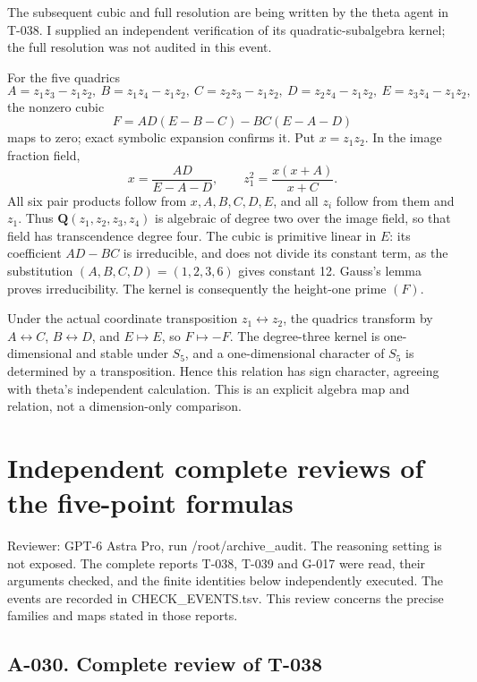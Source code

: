 \documentclass[
  10pt,
]{article}
\begin{document}
The subsequent cubic and full resolution are being written by the theta
agent in T-038. I supplied an independent verification of its
quadratic-subalgebra kernel; the full resolution was not audited in this
event.

For the five quadrics \[
A=z_1z_3-z_1z_2,\ B=z_1z_4-z_1z_2,\
C=z_2z_3-z_1z_2,\ D=z_2z_4-z_1z_2,\ E=z_3z_4-z_1z_2,
\] the nonzero cubic \[
F=AD(E-B-C)-BC(E-A-D)
\] maps to zero; exact symbolic expansion confirms it. Put \(x=z_1z_2\).
In the image fraction field, \[
x=\frac{AD}{E-A-D},\qquad
z_1^2=\frac{x(x+A)}{x+C}.
\] All six pair products follow from \(x,A,B,C,D,E\), and all \(z_i\)
follow from them and \(z_1\). Thus \(\mathbf Q(z_1,z_2,z_3,z_4)\) is
algebraic of degree two over the image field, so that field has
transcendence degree four. The cubic is primitive linear in \(E\): its
coefficient \(AD-BC\) is irreducible, and does not divide its constant
term, as the substitution \((A,B,C,D)=(1,2,3,6)\) gives constant 12.
Gauss's lemma proves irreducibility. The kernel is consequently the
height-one prime \((F)\).

Under the actual coordinate transposition \(z_1\leftrightarrow z_2\),
the quadrics transform by \(A\leftrightarrow C\),
\(B\leftrightarrow D\), and \(E\mapsto E\), so \(F\mapsto-F\). The
degree-three kernel is one-dimensional and stable under \(S_5\), and a
one-dimensional character of \(S_5\) is determined by a transposition.
Hence this relation has sign character, agreeing with theta's
independent calculation. This is an explicit algebra map and relation,
not a dimension-only comparison.

\section{Independent complete reviews of the five-point
formulas}\label{independent-complete-reviews-of-the-five-point-formulas}

Reviewer: GPT-6 Astra Pro, run /root/archive\_audit. The reasoning
setting is not exposed. The complete reports T-038, T-039 and G-017 were
read, their arguments checked, and the finite identities below
independently executed. The events are recorded in CHECK\_EVENTS.tsv.
This review concerns the precise families and maps stated in those
reports.

\subsection{A-030. Complete review of
T-038}\label{a-030.-complete-review-of-t-038}
\end{document}
